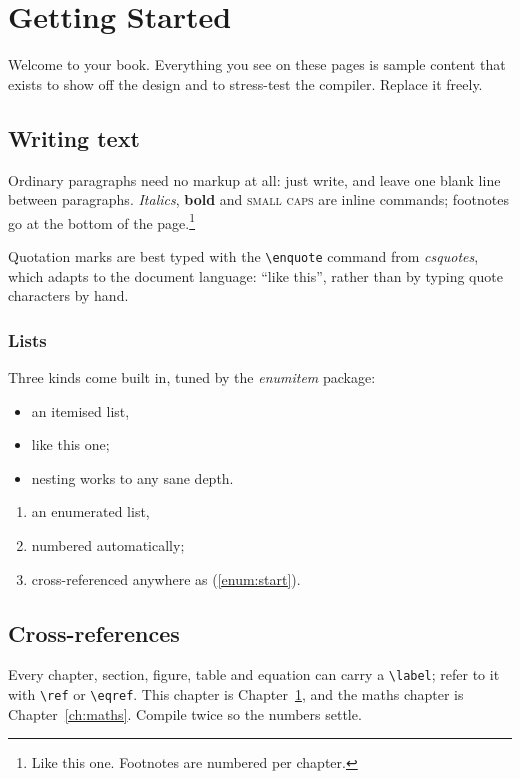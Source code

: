 %
\chapter{Getting Started}\label{ch:intro}

Welcome to your book. Everything you see on these pages is sample
content that exists to show off the design and to stress-test the
compiler. Replace it freely.

\section{Writing text}
Ordinary paragraphs need no markup at all: just write, and leave one
blank line between paragraphs. \emph{Italics}, \textbf{bold} and
\textsc{small caps} are inline commands; footnotes go at the bottom of
the page.\footnote{Like this one. Footnotes are numbered per chapter.}

Quotation marks are best typed with the \texttt{\textbackslash enquote} command from
\emph{csquotes}, which adapts to the document language:
\enquote{like this}, rather than by typing quote characters by hand.

\subsection{Lists}
Three kinds come built in, tuned by the \emph{enumitem} package:
\begin{itemize}[itemsep=2pt]
  \item an itemised list,
  \item like this one;
  \item nesting works to any sane depth.
\end{itemize}
\begin{enumerate}[itemsep=2pt]
  \item an enumerated list,
  \item numbered automatically;
  \item cross-referenced anywhere as (\ref{enum:start}).
        \label{enum:start}
\end{enumerate}

\section{Cross-references}
Every chapter, section, figure, table and equation can carry a
\texttt{\textbackslash label}; refer to it with \texttt{\textbackslash ref} or
\texttt{\textbackslash eqref}. This chapter is
Chapter~\ref{ch:intro}, and the maths chapter is
Chapter~\ref{ch:maths}. Compile twice so the numbers settle.

